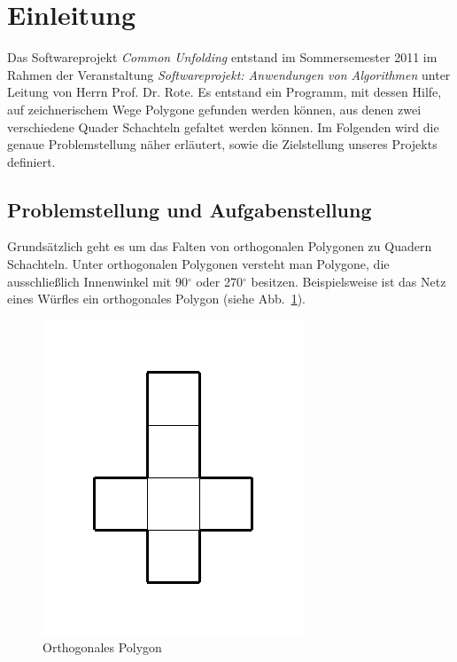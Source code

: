 \section{Einleitung}
\label{sec:einleitung}

Das Softwareprojekt \emph{Common Unfolding} entstand im Sommersemester 2011 im Rahmen der Veranstaltung \emph{Softwareprojekt: Anwendungen von Algorithmen} unter Leitung von Herrn Prof. Dr. Rote. Es entstand ein Programm, mit dessen Hilfe, auf zeichnerischem Wege Polygone gefunden werden können, aus denen zwei verschiedene Quader \bzw Schachteln gefaltet werden können. Im Folgenden wird die genaue Problemstellung näher erläutert, sowie die Zielstellung unseres Projekts definiert.


\subsection{Problemstellung und Aufgabenstellung}
\label{subsec:problemstellung}

Grundsätzlich geht es um das Falten von orthogonalen Polygonen zu Quadern \bzw Schachteln. Unter orthogonalen Polygonen versteht man Polygone, die ausschließlich Innenwinkel mit 90$^\circ$ oder 270$^\circ$ besitzen. Beispielsweise ist das Netz eines Würfles ein orthogonales Polygon (siehe Abb.~\ref{fig:polygon}).

\begin{figure}[htbp]
\centering
\includegraphics{03_pics/polygon.pdf}
\caption{Orthogonales Polygon}
\label{fig:polygon}
\end{figure}

